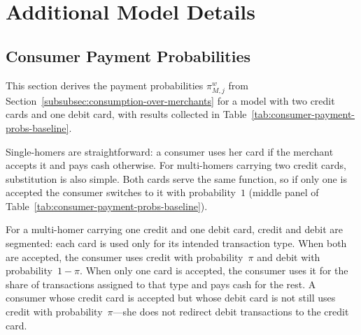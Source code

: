 \documentclass[main.tex]{subfiles}
\begin{document}
\section{Additional Model Details}

\label{sec:oa-model}

\subsection{Consumer Payment Probabilities}\label{subsec:oa-payment-probs}

This section derives the payment probabilities $\pi^w_{M,j}$ from Section~\ref{subsubsec:consumption-over-merchants} for a model with two credit cards and one debit card, with results collected in Table~\ref{tab:consumer-payment-probs-baseline}.

Single-homers are straightforward: a consumer uses her card if the merchant accepts it and pays cash otherwise.
For multi-homers carrying two credit cards, substitution is also simple.
Both cards serve the same function, so if only one is accepted the consumer switches to it with probability~$1$ (middle panel of Table~\ref{tab:consumer-payment-probs-baseline}).

For a multi-homer carrying one credit and one debit card, credit and debit are segmented: each card is used only for its intended transaction type.
When both are accepted, the consumer uses credit with probability~$\pi$ and debit with probability~$1-\pi$.
When only one card is accepted, the consumer uses it for the share of transactions assigned to that type and pays cash for the rest.
A consumer whose credit card is accepted but whose debit card is not still uses credit with probability~$\pi$---she does not redirect debit transactions to the credit card.
\end{document}
